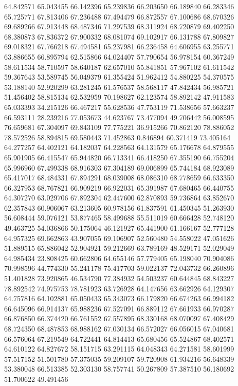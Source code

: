 64.842571
65.043455
66.142396
65.239836
66.203650
66.189840
66.283346
65.725771
67.813406
67.236488
67.494479
66.872557
67.100686
68.670326
69.689266
67.913448
68.487346
71.297539
68.311924
68.720879
69.402250
68.380873
67.836372
67.900332
68.081074
69.102917
66.131788
67.809827
69.018321
67.766218
67.494581
65.237981
66.236458
64.606955
63.255771
63.886655
66.895794
62.515866
64.024407
57.790654
56.978154
60.367249
58.611534
58.710597
58.640187
62.657010
55.841851
57.967102
61.611542
59.367643
53.589745
56.049379
61.355424
51.962412
54.880225
54.370575
53.188140
52.920299
63.281245
61.576537
58.568117
47.842434
56.985721
51.456402
58.815134
62.532959
70.198627
62.123574
58.892142
47.911583
65.033393
34.215126
66.467217
55.628536
47.753119
71.538656
57.663237
66.593111
28.239216
77.053673
44.623767
73.477094
49.706442
56.008595
76.659681
67.304097
69.843109
77.775221
36.915266
70.862120
78.886052
78.572526
58.894815
69.580443
71.452863
0.846894
60.371419
73.405164
64.277257
64.402121
64.182037
64.228563
64.131579
65.176678
64.879555
65.901905
66.415547
65.944820
66.713341
66.418250
67.355190
66.755204
65.996960
67.499338
68.916303
67.304189
69.006899
65.744184
68.923089
65.417017
68.484331
67.894291
68.039008
68.086310
68.778659
66.633350
66.327953
68.767821
66.909219
66.922031
65.391987
67.680465
66.440755
64.307270
63.029706
67.892304
62.447600
62.870893
59.736864
63.852670
62.357843
60.906067
63.213605
60.978156
61.837591
61.450345
51.263930
56.608444
59.076121
53.877465
58.499688
55.511019
60.666428
52.748120
49.463725
54.036866
50.175064
46.121927
65.441900
61.166167
52.777128
64.957325
69.662863
43.907055
69.106907
52.560480
54.558022
47.051626
51.889515
65.886042
52.904921
59.212669
63.789169
48.529171
52.029049
64.985434
23.808425
60.662806
64.655146
57.779405
65.198040
70.904086
70.998596
44.774330
55.241178
75.417703
59.022137
72.043732
66.260896
51.401828
73.920865
46.534790
77.384932
54.503237
60.644845
68.843227
78.892542
74.975753
78.781923
63.726928
64.147656
63.662926
64.129307
64.757816
64.102881
65.050433
65.343073
66.179820
66.674263
66.994182
66.645096
66.914137
65.988236
67.527091
66.889112
67.661933
66.970287
66.876850
66.374420
66.761552
67.557895
68.330168
68.070097
67.408429
68.724350
68.487853
68.988162
67.030134
66.572027
66.056015
67.040681
66.576064
67.219549
64.722441
64.814413
65.680456
65.524867
68.402571
64.610122
64.827672
58.151715
63.291115
64.048343
64.271581
58.601999
57.517152
51.501780
57.375035
59.209107
59.720908
61.934216
56.648339
53.380048
66.513385
52.303130
58.757741
50.267809
57.387510
56.180692
51.700622
49.491456
